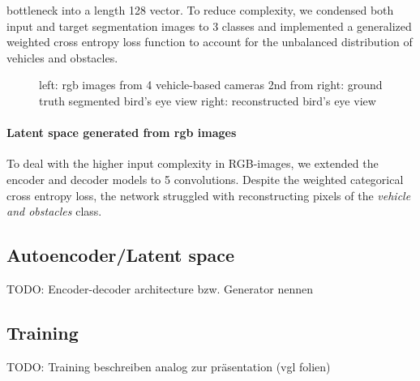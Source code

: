 \documentclass[letterpaper, 10 pt, conference]{ieeeconf}  %
\begin{document}
bottleneck into a length 128 vector. To reduce complexity, we condensed both input and target segmentation images to 3 classes 
and implemented a generalized weighted cross entropy\cite{zhangGeneralizedCrossEntropy2018} loss function to 
account for the unbalanced distribution of vehicles and obstacles.
\begin{figure}[thpb]
   \centering
   \caption{left: rgb images from 4 vehicle-based cameras
            \newline 2nd from right: ground truth segmented bird's eye view
            \newline right: reconstructed bird's eye view}
       \label{figurelabel}
       \end{figure}

\paragraph{Latent space generated from rgb images} To deal with the higher input complexity in RGB-images, we extended the
encoder and decoder models to 5 convolutions. Despite the weighted categorical cross entropy loss, the network struggled with
reconstructing pixels of the \textit{vehicle and obstacles} class. 
       
\subsection{Autoencoder/Latent space}
TODO: Encoder-decoder architecture bzw. Generator nennen
\subsection{Training}
TODO: Training beschreiben analog zur präsentation (vgl folien)
\end{document}
